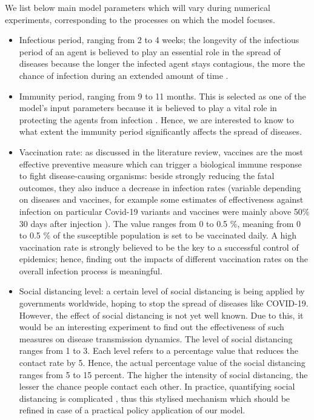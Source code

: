 \documentclass[smallextended]{svjour3}       %
\begin{document}
We list below main model parameters which will vary during numerical experiments, corresponding to the processes on which the model focuses.

\begin{itemize}
	\item Infectious period, ranging from 2 to 4 weeks; the longevity of the infectious period of an agent is believed to play an essential role in the spread of diseases because the longer the infected agent stays contagious, the more the chance of infection during an extended amount of time \cite{wilkinson2018impact}.
	\item Immunity period, ranging from 9 to 11 months. This is selected as one of the model’s input parameters because it is believed to play a vital role in protecting the agents from infection \cite{reyes2016modeling}. Hence, we are interested to know to what extent the immunity period significantly affects the spread of diseases.
	\item Vaccination rate: as discussed in the literature review, vaccines are the most effective preventive measure which can trigger a biological immune response to fight disease-causing organisms: beside strongly reducing the fatal outcomes, they also induce a decrease in infection rates (variable depending on diseases and vaccines, for example some estimates of effectiveness against infection on particular Covid-19 variants and vaccines were mainly above 50\% 30 days after injection \cite{mohammed2022efficacy}). The value ranges from 0 to 0.5 \%, meaning from 0 to 0.5 \% of the susceptible population is set to be vaccinated daily. A high vaccination rate is strongly believed to be the key to a successful control of epidemics; hence, finding out the impacts of different vaccination rates on the overall infection process is meaningful.
	\item Social distancing level: a certain level of social distancing is being applied by governments worldwide, hoping to stop the spread of diseases like COVID-19. However, the effect of social distancing is not yet well known. Due to this, it would be an interesting experiment to find out the effectiveness of such measures on disease transmission dynamics. The level of social distancing ranges from 1 to 3. Each level refers to a percentage value that reduces the contact rate by 5. Hence, the actual percentage value of the social distancing ranges from 5 to 15 percent. The higher the intensity of social distancing, the lesser the chance people contact each other. In practice, quantifying social distancing is complicated \cite{caley2008quantifying}, thus this stylised mechanism which should be refined in case of a practical policy application of our model.
\end{itemize}
\end{document}
